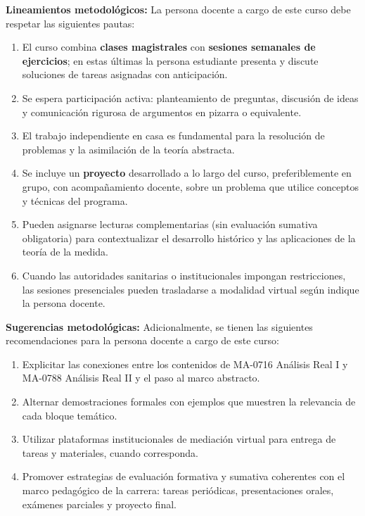 \begin{refsection}
\noindent \textbf{Lineamientos metodológicos:} La persona docente a cargo de este curso debe respetar las siguientes pautas:

\begin{enumerate}
    \item El curso combina \textbf{clases magistrales} con \textbf{sesiones semanales de ejercicios}; en estas últimas la persona estudiante presenta y discute soluciones de tareas asignadas con anticipación.
    \item Se espera participación activa: planteamiento de preguntas, discusión de ideas y comunicación rigurosa de argumentos en pizarra o equivalente.
    \item El trabajo independiente en casa es fundamental para la resolución de problemas y la asimilación de la teoría abstracta.
    \item Se incluye un \textbf{proyecto} desarrollado a lo largo del curso, preferiblemente en grupo, con acompañamiento docente, sobre un problema que utilice conceptos y técnicas del programa.
    \item Pueden asignarse lecturas complementarias (sin evaluación sumativa obligatoria) para contextualizar el desarrollo histórico y las aplicaciones de la teoría de la medida.
    \item Cuando las autoridades sanitarias o institucionales impongan restricciones, las sesiones presenciales pueden trasladarse a modalidad virtual según indique la persona docente.
\end{enumerate}

\textbf{Sugerencias metodológicas:} Adicionalmente, se tienen las siguientes recomendaciones para la persona docente a cargo de este curso:

\begin{enumerate}
    \item Explicitar las conexiones entre los contenidos de MA-0716 Análisis Real I y MA-0788 Análisis Real II y el paso al marco abstracto.
    \item Alternar demostraciones formales con ejemplos que muestren la relevancia de cada bloque temático.
    \item Utilizar plataformas institucionales de mediación virtual para entrega de tareas y materiales, cuando corresponda.
    \item Promover estrategias de evaluación formativa y sumativa coherentes con el marco pedagógico de la carrera: tareas periódicas, presentaciones orales, exámenes parciales y proyecto final.


\end{enumerate}
\end{refsection}
